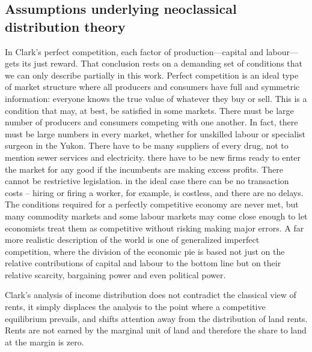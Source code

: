 \subsection{Assumptions underlying neoclassical distribution theory}
 In Clark's  perfect competition, %
 each factor of production—capital and labour—gets its just reward. That conclusion rests on a demanding set of conditions that we can only describe partially in this work. Perfect competition is an ideal type of market structure where all producers and consumers have full and symmetric information: everyone knows the true value of whatever they buy or sell.  This is a condition that may, at best, be satisfied in some markets. There must be large number of producers and consumers competing with one another. In fact, there must be large numbers in every market, whether for unskilled labour or specialist surgeon in the Yukon.  There have to be many suppliers of every drug, not to mention sewer services and electricity. there have to be new firms ready to enter the market  for any good  if the incumbents are making excess profits. There cannot be restrictive legislation. in the ideal case there can be no transaction costs -- hiring or firing a worker, for example,  is costless,  and there are no delays. The conditions required for a perfectly competitive economy are never met, but many commodity markets and some labour markets may come close enough to let economists treat them as competitive without risking making major errors. 
 A far more realistic description of the world is one of generalized  \gls{imperfect competition}, where the division of the economic pie is based not just on the relative contributions of capital and labour to the bottom line but on their relative scarcity, bargaining power and even political power.  %
 
Clark's analysis of income distribution does not contradict the classical view of rents, it simply displaces the analysis to the point where a competitive equilibrium prevails, and shifts attention away from the distribution of land rents. Rents are not earned by the marginal unit of land and therefore the share to land at the margin is zero. 


